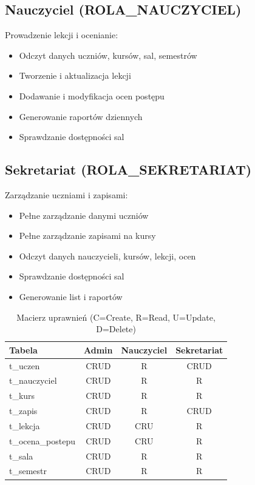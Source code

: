 \documentclass[12pt,a4paper]{article}
\begin{document}
\subsection{Nauczyciel (ROLA\_NAUCZYCIEL)}
Prowadzenie lekcji i ocenianie:
\begin{itemize}[nosep]
    \item Odczyt danych uczniów, kursów, sal, semestrów
    \item Tworzenie i aktualizacja lekcji
    \item Dodawanie i modyfikacja ocen postępu
    \item Generowanie raportów dziennych
    \item Sprawdzanie dostępności sal
\end{itemize}

\subsection{Sekretariat (ROLA\_SEKRETARIAT)}
Zarządzanie uczniami i zapisami:
\begin{itemize}[nosep]
    \item Pełne zarządzanie danymi uczniów
    \item Pełne zarządzanie zapisami na kursy
    \item Odczyt danych nauczycieli, kursów, lekcji, ocen
    \item Sprawdzanie dostępności sal
    \item Generowanie list i raportów
\end{itemize}

\begin{table}[h]
\centering
\begin{tabular}{|l|c|c|c|}
\hline
\textbf{Tabela} & \textbf{Admin} & \textbf{Nauczyciel} & \textbf{Sekretariat} \\
\hline
t\_uczen & CRUD & R & CRUD \\
t\_nauczyciel & CRUD & R & R \\
t\_kurs & CRUD & R & R \\
t\_zapis & CRUD & R & CRUD \\
t\_lekcja & CRUD & CRU & R \\
t\_ocena\_postepu & CRUD & CRU & R \\
t\_sala & CRUD & R & R \\
t\_semestr & CRUD & R & R \\
\hline
\end{tabular}
\caption{Macierz uprawnień (C=Create, R=Read, U=Update, D=Delete)}
\end{table}
\end{document}
